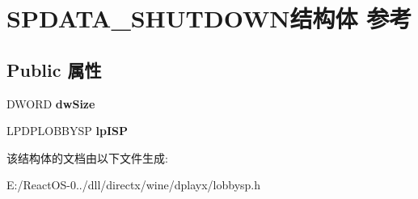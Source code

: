 \hypertarget{struct_s_p_d_a_t_a___s_h_u_t_d_o_w_n}{}\section{S\+P\+D\+A\+T\+A\+\_\+\+S\+H\+U\+T\+D\+O\+W\+N结构体 参考}
\label{struct_s_p_d_a_t_a___s_h_u_t_d_o_w_n}
\subsection*{Public 属性}
\begin{DoxyCompactItemize}
\item 
\mbox{\label{struct_s_p_d_a_t_a___s_h_u_t_d_o_w_n_a90d991f72464a28124ddf503d09c5565}} 
D\+W\+O\+RD {\bfseries dw\+Size}
\item 
\mbox{\label{struct_s_p_d_a_t_a___s_h_u_t_d_o_w_n_adc7bbdac2bea9f885f6c418d9d4d11eb}} 
L\+P\+D\+P\+L\+O\+B\+B\+Y\+SP {\bfseries lp\+I\+SP}
\end{DoxyCompactItemize}


该结构体的文档由以下文件生成\+:\begin{DoxyCompactItemize}
\item 
E\+:/\+React\+O\+S-\/0../dll/directx/wine/dplayx/lobbysp.\+h\end{DoxyCompactItemize}
